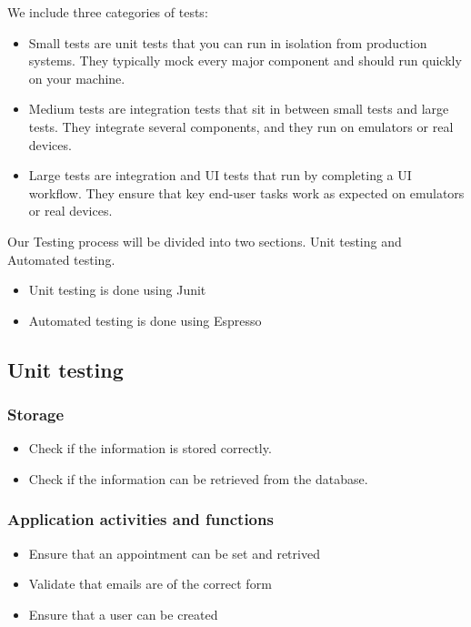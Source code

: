 \documentclass[english]{article}
\begin{document}
	We include three categories of tests:
	
		\begin{itemize} 
			\item Small tests are unit tests that you can run in isolation from production systems. They typically mock every major component and should run 				quickly on your machine.
			\item Medium tests are integration tests that sit in between small tests and large tests. They integrate several components, and they run on 						emulators or real devices.
			\item Large tests are integration and UI tests that run by completing a UI workflow. They ensure that key end-user tasks work as expected on 						emulators or real devices.
		\end{itemize}
		Our Testing process will be divided into two sections. Unit testing and Automated testing. 
		\begin{itemize} 
			\item Unit testing is done using Junit
			\item Automated testing is done using Espresso
		
		\end{itemize}
			

	
	\subsection {Unit testing}
			\subsubsection{Storage}
		\begin{itemize} 
			\item Check if the information is stored correctly.
			\item Check if the information can be retrieved from the database.
		\end{itemize}
			\subsubsection{Application activities and functions}
			\begin{itemize}
				\item Ensure that an appointment can be set and retrived
				\item Validate that emails are of the correct form 
				\item Ensure that a user can be created
			\end{itemize}
	
\end{document}
